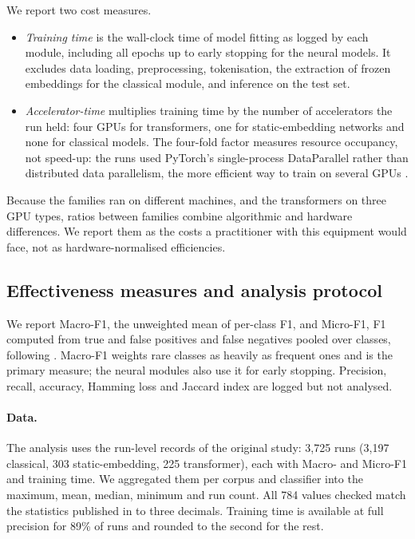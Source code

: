 \documentclass{ijis}
\begin{document}
We report two cost measures.
\begin{itemize}
\setlength\itemsep{1pt}
\item \emph{Training time} is the wall-clock time of model fitting as logged by each module, including all epochs up to early stopping for the neural models. It excludes data loading, preprocessing, tokenisation, the extraction of frozen embeddings for the classical module, and inference on the test set.
\item \emph{Accelerator-time} multiplies training time by the number of accelerators the run held: four GPUs for transformers, one for static-embedding networks and none for classical models. The four-fold factor measures resource occupancy, not speed-up: the runs used PyTorch's single-process DataParallel rather than distributed data parallelism, the more efficient way to train on several GPUs \cite{li2020pytorchdistributedexperiencesaccelerating}.
\end{itemize}
Because the families ran on different machines, and the transformers on three GPU types, ratios between families combine algorithmic and hardware differences. We report them as the costs a practitioner with this equipment would face, not as hardware-normalised efficiencies.

\subsection{Effectiveness measures and analysis protocol}\label{sec:protocol}

We report Macro-F1, the unweighted mean of per-class F1, and Micro-F1, F1 computed from true and false positives and false negatives pooled over classes, following \cite{moreo2021}. Macro-F1 weights rare classes as heavily as frequent ones and is the primary measure; the neural modules also use it for early stopping. Precision, recall, accuracy, Hamming loss and Jaccard index are logged but not analysed.

\paragraph{Data.} The analysis uses the run-level records of the original study: 3,725 runs (3,197 classical, 303 static-embedding, 225 transformer), each with Macro- and Micro-F1 and training time. We aggregated them per corpus and classifier into the maximum, mean, median, minimum and run count. All 784 values checked match the statistics published in \cite{worth2025layercake} to three decimals. Training time is available at full precision for 89\% of runs and rounded to the second for the rest.
\end{document}
